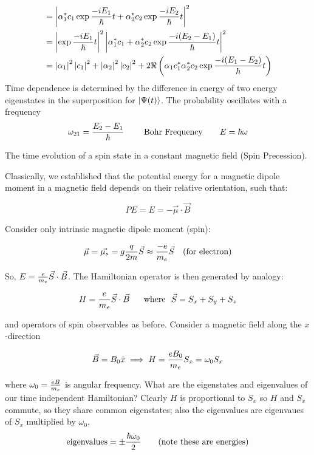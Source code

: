 \documentclass[english, 11pt]{article}
\begin{document}
\begin{itemize}
\begin{itemize}
\begin{align*}
          & = \left|\alpha_1^*c_1\exp{\frac{-iE_1}{\hbar}t}+\alpha_2^*c_2\exp{\frac{-iE_2}{\hbar}t}\right|^2 \\
          & = \left|\exp{\frac{-iE_1}{\hbar}t}\right|^2\left|\alpha_1^*c_1 + \alpha_2^*c_2\exp{\frac{-i(E_2-E_1)}{\hbar}t}\right|^2 \\
          & = \left|\alpha_1\right|^2\left|c_1\right|^2 + \left|\alpha_2\right|^2\left|c_2\right|^2 + 2\Re \left( \alpha_1c_1^*\alpha_2^*c_2\exp{\frac{-i(E_1 - E_2)}{\hbar}t} \right)
        \end{align*}
        Time dependence is determined by the difference in energy of two energy eigenstates in the superposition for $\left|\Psi(t)\right\rangle$. The probability oscillates with a frequency
        \[ \omega_{21} = \frac{E_2-E_1}{\hbar} \ \ \ \ \ \ \ \mbox{Bohr Frequency} \ \ \ \ \ \ E =\hbar \omega \]
      \end{itemize}
    \end{itemize}

    \begin{exmp}
      The time evolution of a spin state in a constant magnetic field (Spin Precession).
    \end{exmp}

    Classically, we established that the potential energy for a magnetic dipole moment in a magnetic field depends on their relative orientation, such that:

    \[ PE = E = - \vec{\mu} \cdot \vec{B} \]

    Consider only intrinsic magnetic dipole moment (spin):

    \[ \vec{\mu} = \vec{\mu_s} = g \frac{q}{2m}\vec{S} \approx \frac{-e}{m_e}\vec{S} \ \ \ \mbox{(for electron)} \]

    So, $E = \frac{e}{m_e}\vec{S}\cdot\vec{B}$. The Hamiltonian operator is then generated by analogy:

    \[ H = \f{e}{m_e}\vec{S}\cdot\vec{B} \ \ \ \  \mbox{\ where \ } \vec{S} = S_x + S_y + S_z \]

    and operators of spin observables as before. Consider a magnetic field along the $x$-direction

    \[ \vec{B} = B_0 \hat{x} \implies H = \frac{eB_0}{m_e}S_x = \omega_0 S_x \]

    where $\omega_0 = \frac{eB}{m_e}$ is angular frequency. What are the eigenstates and eigenvalues of our time independent Hamiltonian? Clearly $H$ is proportional to $S_x$ so $H$ and $S_x$ commute, so they share common eigenstates; also the eigenvalues are eigenvaues of $S_x$ multiplied by $\omega_0$,
    \[ \mbox{eigenvalues} = \pm \frac{\hbar\omega_0}{2} \ \ \ \ \ \ \mbox{(note these are energies)} \]
\end{document}
